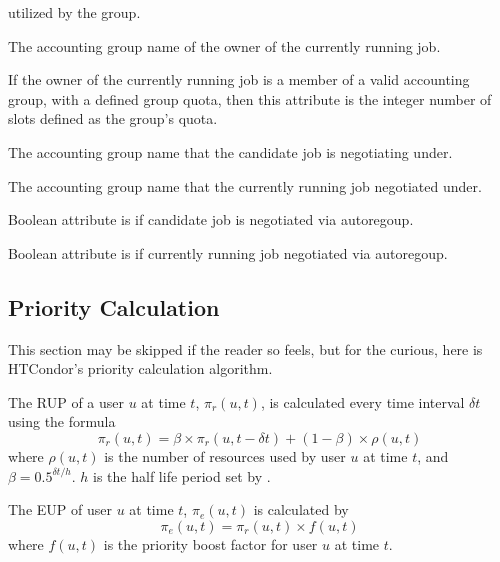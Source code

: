 \begin{description}
  utilized by the group.
\item[\index{ClassAd attribute, ephemeral!RemoteGroup}\AdAttr{RemoteGroup}:]
  The accounting group name of the owner of the currently running job.
\item[\index{ClassAd attribute, ephemeral!RemoteGroupQuota}\AdAttr{RemoteGroupQuota}:]
  If the owner of the currently running job is a member of a valid 
  accounting group, with a defined group quota,
  then this attribute is the integer number of slots defined as the
  group's quota.
\item[\index{ClassAd attribute, ephemeral!SubmitterNegotiatingGroup}\AdAttr{SubmitterNegotiatingGroup}:]
  The accounting group name that the candidate job is negotiating under.
\item[\index{ClassAd attribute, ephemeral!RemoteNegotiatingGroup}\AdAttr{RemoteNegotiatingGroup}:]
  The accounting group name that the currently running job negotiated under.
\item[\index{ClassAd attribute, ephemeral!SubmitterAutoregroup}\AdAttr{SubmitterAutoregroup}:]
  Boolean attribute is  if candidate job is negotiated via autoregoup.
\item[\index{ClassAd attribute, ephemeral!RemoteAutoregroup}\AdAttr{RemoteAutoregroup}:]
  Boolean attribute is  if currently running job negotiated via autoregoup.
\end{description}


\subsection{Priority Calculation}
This section may be skipped if the reader so feels, but for the curious,
here is HTCondor's priority calculation algorithm.

The RUP of a user $u$ at time $t$, $\pi_r(u,t)$, is calculated 
every time interval $\delta t$ using the formula 
$$\pi_r(u,t) = \beta\times\pi_r(u,t-\delta t) + (1-\beta)\times\rho(u,t)$$
where $\rho(u,t)$ is the number of resources used by user $u$ at time $t$,
and $\beta=0.5^{{\delta t}/h}$. $h$ is the half life period set by 
.

The EUP of user $u$ at time $t$, $\pi_e(u,t)$
is calculated by
$$\pi_e(u,t) = \pi_r(u,t)\times f(u,t)$$
where $f(u,t)$ is the priority boost factor for user $u$ at time $t$.

